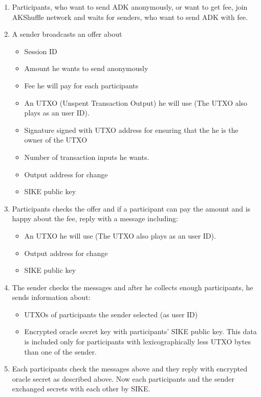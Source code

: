 \documentclass[a4paper,10pt,twocolumn]{article}
\begin{document}
\begin{enumerate}
	\setlength\itemsep{0em}
	\item Participants, who want to send ADK anonymously, or want to get fee, join AKShuffle network and waits for senders, who want to send ADK
	with fee.
	\item A sender broadcasts an offer about 
	\begin{itemize}
		\setlength\itemsep{0em}
		\item Session ID
		\item Amount he wants to send anonymously
		\item Fee he will pay for each participants
		\item An UTXO (Unspent Transaction Output) he will use (The UTXO also plays as an user ID).
		\item Signature signed with UTXO address for ensuring that the he is the owner of the UTXO
		\item Number of transaction inputs he wants.
		\item Output address for change
		\item SIKE public key
	\end{itemize}
	\item Participants checks the offer and if a participant can pay the amount and is happy about the fee, reply with a message including:
	\begin{itemize}
		\setlength\itemsep{0em}
		\item An UTXO he will use (The UTXO also plays as an user ID).
		\item Output address for change
		\item SIKE public key
	\end{itemize}
	\item The sender checks the messages  and after he  collects enough participants, he sends information about:
	\begin{itemize}
		\setlength\itemsep{0em}
		\item UTXOs of participants the sender selected (as user ID)
		\item Encrypted oracle secret key with participants' SIKE public key. 
		This data is included only for participants with lexicographically less UTXO bytes than one of the sender.
	\end{itemize}
	\item Each participants check the messages above  and they reply with encrypted oracle secret as described above.
	Now each participants and the sender exchanged secrets with each other by SIKE.

\end{enumerate}
\end{document}
